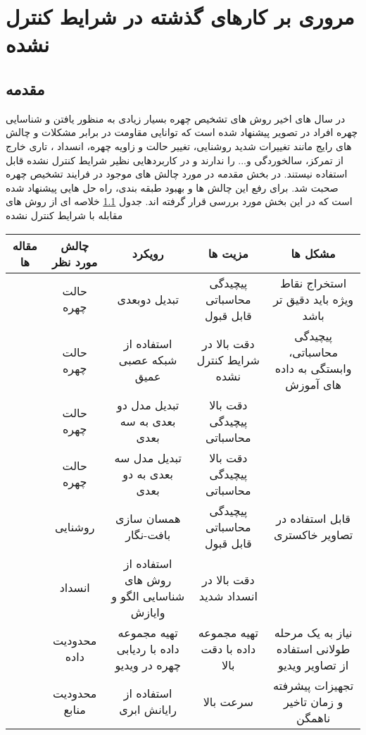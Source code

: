\chapter{مروری بر کارهای گذشته در شرایط کنترل نشده}
\section{مقدمه}
در سال های اخیر روش های تشخیص چهره بسیار زیادی به منظور یافتن و شناسایی چهره افراد در تصویر پیشنهاد شده است که توانایی مقاومت در برابر مشکلات و چالش های رایج مانند تغییرات شدید روشنایی، تغییر حالت و زاویه چهره، انسداد ، تاری خارج از تمرکز، سالخوردگی و... را ندارند و در کاربردهایی نظیر شرایط کنترل نشده قابل استفاده نیستند. در بخش مقدمه در مورد چالش های موجود در فرایند تشخیص چهره صحبت شد. برای رفع این چالش ها و بهبود طبقه بندی، راه حل هایی پیشنهاد شده است که در این بخش مورد بررسی قرار گرفته اند.
جدول \ref{table3-1} خلاصه ای از روش های مقابله با شرایط کنترل نشده

\begin{table}[ht]
\label{table3-1}
\begin{center}
\resizebox{\textwidth}{!}
{
\begin{tabular}{|c|c|c|c|c|}
\hline 
مقاله ها & چالش مورد نظر & رویکرد & مزیت ها & مشکل ها
\\
\hline 
\cite{HAGHIGHAT201623, LV2016465, amos2016openface, 6196234}
& حالت چهره	 & تبدیل دوبعدی & 	پیچیدگی محاسباتی قابل قبول & 	استخراج نقاط ویژه باید دقیق تر باشد
 \\
\hline
\cite{wu2016facial, 7477555, 7780892, 7532959, 7298667}
 & حالت چهره & 	استفاده از شبکه عصبی عمیق & دقت بالا در شرایط کنترل نشده & 	پیچیدگی محاسباتی، وابستگی به داده های آموزش 
\\
\hline
\cite{HU2017366, hassner2014effective, 7298679, 7006757, 6905796}
 & حالت چهره & 	تبدیل مدل دو بعدی به سه بعدی & 	دقت بالا 	پیچیدگی محاسباتی &
\\
\hline 
\cite{DING2017144}
& حالت چهره & 	تبدیل مدل سه بعدی به دو بعدی & 	دقت بالا 	پیچیدگی محاسباتی &
\\
\hline
\cite{6196234, HUSSAINSHAH201597}
 & روشنایی	 & همسان سازی بافت-نگار & 	پیچیدگی محاسباتی قابل قبول & 	قابل استفاده در تصاویر خاکستری
\\
\hline
\cite{7015448, WU2018256}
 & انسداد	 & استفاده از روش های شناسایی الگو و وایازش & 	دقت بالا در انسداد شدید &	
\\
\hline
\cite{7984553}
 & محدودیت داده	 & تهیه مجموعه داده با ردیابی چهره در ویدیو & 	تهیه مجموعه داده با دقت بالا & 	نیاز به یک مرحله طولانی استفاده از تصاویر ویدیو
\\
\hline
\cite{6249269, HU2018582}
 & محدودیت منابع & 	استفاده از رایانش ابری & 	سرعت بالا & 	تجهیزات پیشرفته و زمان تاخیر ناهمگن
\\
\hline
\end{tabular}}
\end{center} 
\end{table} 

